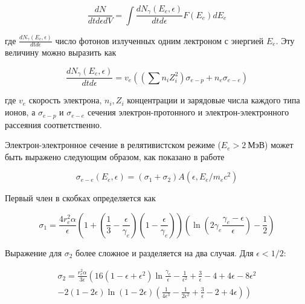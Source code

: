 \begin{equation}
	\frac{dN}{dt d\epsilon dV} = \int\frac{dN_{\gamma}\left(E_e, \epsilon\right)}{dt d\epsilon} F(E_e) dE_e
\end{equation}

где $\frac{dN_{\gamma}\left(E_e, \epsilon\right)}{dt d\epsilon}$ число фотонов излученных одним лектроном с энергией $E_e$. Эту величину можно выразить как

\begin{equation}
	\frac{dN_{\gamma}\left(E_e, \epsilon\right)}{dt d\epsilon} = v_e \left(\left(\sum n_i Z_i^2\right)\sigma_{e-p} + n_e\sigma_{e-e}\right)
\end{equation}

где $v_e$ скорость электрона, $n_i, Z_i$ концентрации и зарядовые числа каждого типа ионов, а $\sigma_{e-p}$ и $\sigma_{e-e}$ сечения электрон-протонного и электрон-электронного рассеяния соответственно.

Электрон-электронное сечение в релятивистском режиме ($E_e > 2~\text{МэВ}$) может быть выражено следующим образом, как показано в работе \cite{BaierJETP1967}

\begin{equation}
\sigma_{e-e}(E_e,\epsilon) = \left(\sigma_1 + \sigma_2\right)A\left(\epsilon, E_e/m_e c^2\right)
\end{equation}

Первый член в скобках определяется как

\begin{equation}\label{sigma1}
	\sigma_1 = \frac{4 r_e^2 \alpha}{\epsilon}\left(1+\left(\frac{1}{3}-\frac{\epsilon}{\gamma_e}\right)\left(1-\frac{\epsilon}{\gamma_e}\right)\right)\left(\ln\left(2\gamma_e\frac{\gamma_e - \epsilon}{\epsilon}\right)-\frac{1}{2}\right)
\end{equation}

Выражение для $\sigma_2$ более сложное и разделяется на два случая. Для $\epsilon < 1/2$:

\begin{equation}
	\begin{split}
		\sigma_2 = \frac{r_e^2\alpha}{3\epsilon} \left( 16 \left( 1-\epsilon+\epsilon^2 \right) \ln\frac{\gamma_e}{\epsilon}-\frac{1}{\epsilon^2}+\frac{3}{\epsilon}-4+4\epsilon-8\epsilon^2 \right. \\ \left. - 2\left( 1-2\epsilon \right) \ln \left( 1-2\epsilon \right) \left( \frac{1}{4\epsilon^3}-\frac{1}{2\epsilon^2}+\frac{3}{\epsilon}-2+4\epsilon \right) \right)
	\end{split}
\end{equation}

